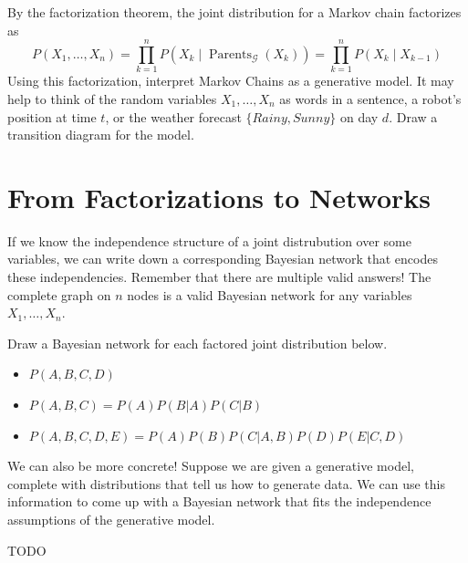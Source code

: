 \documentclass{discussion}
\DeclareMathOperator{\Parents}{Parents}
\newcommand{\G}{\mathcal{G}}
\begin{document}
\begin{exercise}
By the factorization theorem, the joint distribution for a Markov chain factorizes as
    \begin{equation*}
    P(X_1,\dots,X_n)
    = \prod_{k=1}^n P(X_k \mid \Parents_\G(X_k))
    = \prod_{k=1}^n P(X_k \mid X_{k-1})
    \end{equation*}
Using this factorization, interpret Markov Chains as a generative model.  It may help to think of the random variables $X_1, \dots, X_n$ as words in a sentence, a robot's position at time $t$, or the weather forecast $\{ Rainy, Sunny \}$ on day $d$.  Draw a transition diagram for the model.
\end{exercise}

\section{From Factorizations to Networks}

If we know the independence structure of a joint distrubution over some variables, we can write down a corresponding Bayesian network that encodes these independencies.  Remember that there are multiple valid answers!  The complete graph on $n$ nodes is a valid Bayesian network for any variables $X_1, \dots, X_n$.

\begin{exercise}
Draw a Bayesian network for each factored joint distribution below.
    \begin{itemize}
    \item $P(A,B,C,D)$
    \item $P(A,B,C) = P(A)P(B|A)P(C|B)$
    \item $P(A,B,C,D,E) = P(A)P(B)P(C|A,B)P(D)P(E|C,D)$
    \end{itemize}
\end{exercise}

We can also be more concrete!  Suppose we are given a generative model, complete with distributions that tell us how to generate data.  We can use this information to come up with a Bayesian network that fits the independence assumptions of the generative model.

\begin{example}
TODO
\end{example}
\end{document}
